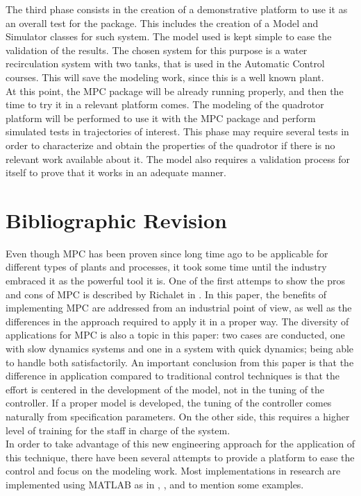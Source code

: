 The third phase consists in the creation of a demonstrative platform to use it as an overall test for the package. This includes the creation of a Model and Simulator classes for such system. The model used is kept simple to ease the validation of the results. The chosen system for this purpose is a water recirculation system with two tanks, that is used in the Automatic Control courses. This will save the modeling work, since this is a well known plant. \\

At this point, the MPC package will be already running properly, and then the time to try it in a relevant platform comes. The modeling of the quadrotor platform will be performed to use it with the MPC package and perform simulated tests in trajectories of interest. This phase may require several tests in order to characterize and obtain the properties of the quadrotor if there is no relevant work available about it. The model also requires a validation process for itself to prove that it works in an adequate manner. 

\section{Bibliographic Revision}

Even though MPC has been proven since long time ago to be applicable for different types of plants and processes, it took some time until the industry embraced it as the powerful tool it is. One of the first attemps to show the pros and cons of MPC is described  by Richalet in \cite{Richalet1993}. In this paper, the benefits of implementing MPC are addressed from an industrial point of view, as well as the differences in the approach required to apply it in a proper way. The diversity of applications for MPC is also a topic in this paper: two cases are conducted, one with slow dynamics systems and one in a system with quick dynamics; being able to handle both satisfactorily. An important conclusion from this paper is that the difference in application compared to traditional control techniques is that the effort is centered in the development of the model, not in the tuning of the controller. If a proper model is developed, the tuning of the controller comes naturally from specification parameters. On the other side, this requires a higher level of training for the staff in charge of the system.\\

In order to take advantage of this new engineering approach for the application of this technique, there have been several attempts to provide a platform to ease the control and focus on the modeling work. Most implementations in research are implemented using MATLAB\textsuperscript{\textregistered} as in \cite{ref:Gabrielsson2012}, \cite{ref:Molero2011}, \cite{HercegetAl2006} and \cite{Johansson2012} to mention some examples.\\

